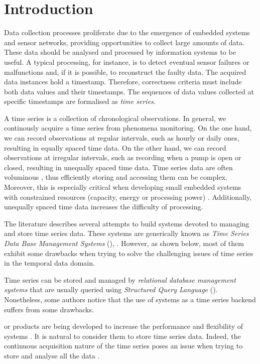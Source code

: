 \section{Introduction}

Data collection processes proliferate due to the emergence of embedded
systems and sensor networks, providing opportunities to collect large
amounts of data.  These data should be analysed and processed by
information systems to be useful. A typical processing, for instance,
is to detect eventual sensor failures or malfunctions and, if it is
possible, to reconstruct the faulty data. The acquired data instances
hold a timestamp. Therefore, correctness criteria must include both
data values and their timestamps. The sequences of data values
collected at specific timestamps are formalised as \emph{time series}.

A time series is a collection of chronological observations.  In
general, we continously acquire a time series from phenomena
monitoring. On the one hand, we can record observations at regular
intervals, such as hourly or daily ones, resulting in equally spaced
time data.  On the other hand, we can record observations at irregular
intervals, such as recording when a pump is open or closed, resulting
in unequally spaced time data. Time series data are often voluminous
\cite{fu11,keogh08:isax}, thus efficiently storing and accessing them
can be complex. Moreover, this is especially critical when developing
small embedded systems with constrained resources (capacity, energy or
processing power) \cite{yaogehrke02}. Additionally, unequally spaced
time data increases the difficulty of processing.

The literature describes several attempts to build systems devoted to
managing and store time series data. These systems are generically
known as \emph{Time Series Data Base Management Systems}
(), \cite{dreyer94,last01}. However, as shown below, most
of them exhibit some drawbacks when trying to solve the challenging
issues of time series in the temporal data domain.

Time series can be stored and managed by \emph{relational database
  management systems} that are usually queried using \emph{Structured
  Query Language} (). Nonetheless, some authors
\cite{dreyer94,schmidt95,stonebraker09:scidb,zhang11} notice that the
use of  systems as a time series backend suffers from some
drawbacks.

 or  products are being developed to
increase the performance and flexibility of  systems
\cite{atzeni13:relational_model_dead,stonebraker10,stonebraker09:scidb,zhang11}. It
is natural to consider them to store time series data. Indeed, the
continuous acquisition nature of the time series poses an issue when
trying to store and analyse all the data \cite{keogh97}.


